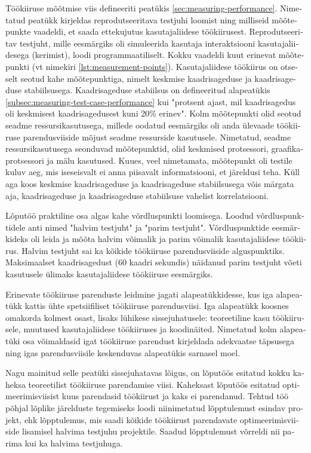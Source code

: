\documentclass[a4paper,12pt]{article}
\begin{document}
\begin{otherlanguage}{estonian}
Töökiiruse mõõtmise viis defineeriti peatükis \ref{sec:measuring-performance}. Nimetatud peatükk kirjeldas reprodutseeritava testjuhi loomist ning milliseid mõõtepunkte vaadeldi, et saada ettekujutus kasutajaliidese töökiirusest. Reprodutseeritav testjuht, mille eesmärgiks oli simuleerida kasutaja interaktsiooni kasutajaliidesega (kerimist), loodi programmaatiliselt. Kokku vaadeldi kuut erinevat mõõtepunkti (vt nimekiri \ref{lst:measurement-points}). Kasutajaliidese töökiirus on otseselt seotud kahe mõõtepunktiga, nimelt keskmise kaadrisageduse ja kaadrisageduse stabiilsusega. Kaadrisageduse stabiilsus on defineeritud alapeatükis \ref{subsec:measuring-test-case-performance} kui "protsent ajast, mil kaadrisagedus oli keskmisest kaadrisagedusest kuni 20\% erinev". Kolm mõõtepunkti olid seotud seadme ressursikasutusega, millede oodatud eesmärgiks oli anda ülevaade töökiiruse parendusviiside mõjust seadme ressurside kasutusele. Nimetatud, seadme ressursikasutusega seonduvad mõõtepunktid, olid keskmised protsessori, graafikaprotsessori ja mälu kasutused. Kuues, veel nimetamata, mõõtepunkt oli testile kuluv aeg, mis iseseisvalt ei anna piisavalt informatsiooni, et järeldusi teha. Küll aga koos keskmise kaadrisageduse ja kaadrisageduse stabiilsusega võis märgata aja, kaadrisageduse ja kaadrisageduse stabiilsuse vahelist korrelatsiooni.

Lõputöö praktiline osa algas kahe võrdluspunkti loomisega. Loodud võrdluspunktidele anti nimed "halvim testjuht" ja "parim testjuht". Võrdluspunktide eesmärkideks oli leida ja mõõta halvim võimalik ja parim võimalik kasutajaliidese töökiirus. Halvim testjuht sai ka kõikide töökiiruse parendusviiside alguspunktiks. Maksimaalset kaadrisagedust (60 kaadri sekundis) näidanud parim testjuht võeti kasutusele ülimaks kasutajaliidese töökiiruse eesmärgiks.

Erinevate töökiiruse parenduste leidmine jagati alapeatükkidesse, kus iga alapeatükk kattis ühte spetsiifiliset töökiiruse parendusviisi. Iga alapeatükk koosnes omakorda kolmest osast, lisaks lühikese sissejuhatusele: teoreetiline kasu töökiirusele, muutused kasutajaliidese töökiiruses ja koodinäited. Nimetatud kolm alapeatüki osa võimaldasid igat töökiiruse parendust kirjeldada adekvaatse täpsusega ning igas parendusviisile keskenduvas alapeatükis sarnasel moel.

Nagu mainitud selle peatüki sissejuhatavas lõigus, on lõputöös esitatud kokku kaheksa teoreetilist töökiiruse parendamise viisi. Kaheksast lõputöös esitatud optimeerimisviisist kuus parendasid töökiirust ja kaks ei parendanud. Tehtud töö põhjal lõplike järelduste tegemiseks loodi niinimetatud lõpptulemust esindav projekt, ehk lõpptulemus, mis saadi kõikide töökiirust parendavate optimeerimisviiside lisamisel halvima testjuhu projektile. Saadud lõpptulemust võrreldi nii parima kui ka halvima testjuhuga.


\end{otherlanguage}
\end{document}

